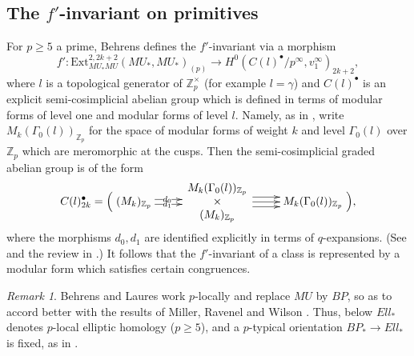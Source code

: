 \documentclass[10pt,a4paper]{amsart}
\theoremstyle{definition}
\theoremstyle{remark}
\newtheorem{rem}[thm]{Remark}
\newcommand{\ext}{\mathrm{Ext}}
\newcommand{\zed}{\mathbb{Z}}
\newcommand{\padics}{\zed_p}
\newcommand{\tmfcoeff}{{Ell}}
\begin{document}
\subsection{The $f'$-invariant on primitives}


For $p \geq 5$ a prime, Behrens \cite{behrens} defines the $f'$-invariant via a morphism
\[
	f' :
\ext^{2,2k+2} _{MU_*MU} (MU_* , MU_*)_{(p)}
\rightarrow
H^0(C (l)^\bullet/p^\infty, v_1 ^\infty )_{2k+2},
\]
where $l$ is a topological generator of $\padics^\times$ (for example $l = \gamma$) and $C(l)^\bullet$ is an
explicit semi-cosimplicial abelian group which is defined in terms of modular forms of level one and modular forms of level $l$. Namely, as in \cite{behrens}, write $M_k (\Gamma_0 (l))_{\padics}$ for the space of modular forms of weight $k$ and level $\Gamma_0(l)$  over $\padics$
which are meromorphic at the cusps. Then the semi-cosimplicial graded abelian group is of the form
\[
C(l)^\bullet_{2k} =
\Big(
\xymatrix{
(M_k)_{\padics}
\ar@<.5ex>[r]|(.4){d_0}
\ar@<-.5ex>[r]|(.4){d_1}
&
*{
\begin{array}{c}
M_k(\Gamma_0 (l))_{\padics}\\
\times\\
	(M_k)_{\padics}
\end{array}
}
\ar@<1ex>[r]
\ar[r]
\ar@<-1ex>[r]
&
M_k(\Gamma_0 (l))_{\padics}
	}
\Big),
\]
where the morphisms $d_0, d_1$ are identified explicitly in terms of $q$-expansions.
(See \cite[Section 6]{behrens} and the review in \cite[Section 3]{behrens_laures}.) It follows that the $f'$-invariant of a class is
represented by a modular form which satisfies certain congruences.

\begin{rem}
	Behrens and Laures work $p$-locally and replace $MU$ by $BP$, so as to accord better with the results of Miller, Ravenel and Wilson \cite{MRW}. Thus, below  $\tmfcoeff_*$
 denotes $p$-local elliptic homology ($p \geq 5$), and a $p$-typical orientation $BP_* \rightarrow \tmfcoeff_*$ is fixed, as in \cite{behrens_laures}.
\end{rem}
\end{document}
